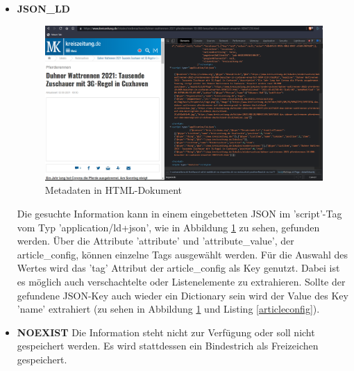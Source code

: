 \documentclass[12pt,oneside,a4paper,parskip]{scrbook}
\begin{document}
\begin{itemize}
\pagebreak

\item \textbf{JSON\_LD}\newline
\begin{figure}[h!]
\caption{Metadaten in HTML-Dokument}
\label{articlejson}
\centering
\includegraphics[scale=0.4]{articles_ld_json.png}
\end{figure} \newline
 Die gesuchte Information kann in einem eingebetteten JSON im 'script'-Tag vom Typ 'application/ld+json', wie in Abbildung \ref{articlejson} zu sehen, gefunden werden. Über die Attribute 'attribute' und 'attribute\_value', der article\_config, können einzelne Tags ausgewählt werden. Für die Auswahl des Wertes wird das 'tag' Attribut der article\_config als Key genutzt. Dabei ist es möglich auch verschachtelte oder Listenelemente zu extrahieren. Sollte der gefundene JSON-Key auch wieder ein Dictionary sein wird der Value des Key 'name' extrahiert (zu sehen in Abbildung \ref{articlejson} und Listing \ref{articleconfig}).

\item \textbf{NOEXIST} \newline
Die Information steht nicht zur Verfügung oder soll nicht gespeichert werden. Es wird stattdessen ein Bindestrich als Freizeichen gespeichert.
\end{itemize}

\pagebreak
\end{document}
